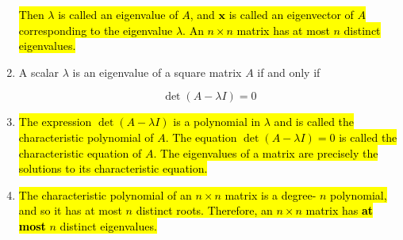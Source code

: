 \documentclass[10pt]{article}
\begin{document}
\begin{enumerate}
\hl{Then $\lambda$ is called an eigenvalue of $A$, and $\mathbf{x}$ is called an eigenvector of $A$ corresponding to the eigenvalue $\lambda$. An $n \times n$ matrix has at most $n$ distinct eigenvalues.}

\item A scalar $\lambda$ is an eigenvalue of a square matrix $A$ if and only if

$$
\operatorname{det}(A-\lambda I)=0
$$

\item \hl{The expression $\operatorname{det}(A-\lambda I)$ is a polynomial in $\lambda$ and is called the characteristic polynomial of $A$. The equation $\operatorname{det}(A-\lambda I)=0$ is called the characteristic equation of $A$. The eigenvalues of a matrix are precisely the solutions to its characteristic equation.}

\item \hl{The characteristic polynomial of an $n \times n$ matrix is a degree- $n$ polynomial, and so it has at most $n$ distinct roots. Therefore, an $n \times n$ matrix has \textbf{at most} $n$ distinct eigenvalues.}

\end{enumerate}



\newpage
\end{document}
